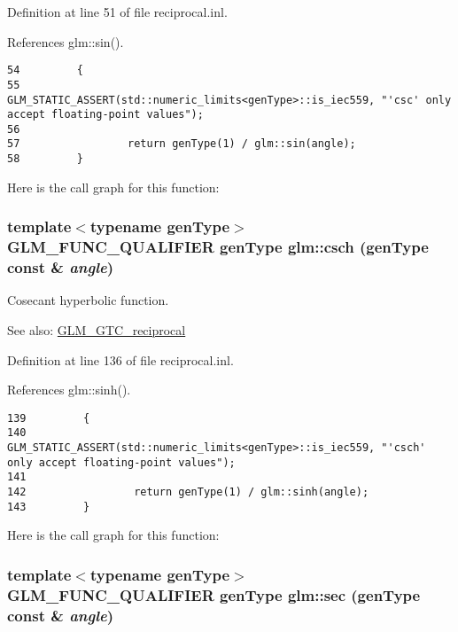 Definition at line 51 of file reciprocal.inl.

References glm::sin().

\begin{Code}\begin{verbatim}54         {
55                 GLM_STATIC_ASSERT(std::numeric_limits<genType>::is_iec559, "'csc' only accept floating-point values");
56 
57                 return genType(1) / glm::sin(angle);
58         }
\end{verbatim}
\end{Code}




Here is the call graph for this function:\hypertarget{group__gtc__reciprocal_g094e1e421d5d9320d4364deb82adb428}{
\subsubsection[csch]{\setlength{\rightskip}{0pt plus 5cm}template$<$typename genType$>$ GLM\_\-FUNC\_\-QUALIFIER genType glm::csch (genType const \& {\em angle})}}
\label{group__gtc__reciprocal_g094e1e421d5d9320d4364deb82adb428}


Cosecant hyperbolic function.

\begin{Desc}
\item[See also:]\hyperlink{group__gtc__reciprocal}{GLM\_\-GTC\_\-reciprocal} \end{Desc}


Definition at line 136 of file reciprocal.inl.

References glm::sinh().

\begin{Code}\begin{verbatim}139         {
140                 GLM_STATIC_ASSERT(std::numeric_limits<genType>::is_iec559, "'csch' only accept floating-point values");
141 
142                 return genType(1) / glm::sinh(angle);
143         }
\end{verbatim}
\end{Code}




Here is the call graph for this function:\hypertarget{group__gtc__reciprocal_gef67dab7093a4d0ccc9c06ca05ddafd4}{
\subsubsection[sec]{\setlength{\rightskip}{0pt plus 5cm}template$<$typename genType$>$ GLM\_\-FUNC\_\-QUALIFIER genType glm::sec (genType const \& {\em angle})}}
\label{group__gtc__reciprocal_gef67dab7093a4d0ccc9c06ca05ddafd4}


